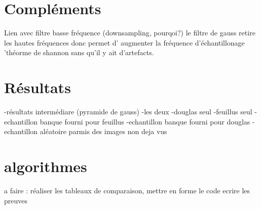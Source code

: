 \documentclass{article}
\begin{document}
\nocite{NatesanResNet} %



\appendix

	\section{Compléments}
		Lien avec filtre basse fréquence (downsampling, pourqoi?)
		le filtre de gauss retire les hautes fréquences donc permet d' augmenter la fréquence d'échantillonage 'théorme de shannon sans qu'il y ait d'artefacts. 
	
	\section{Résultats}	
		-résultats intermédiare (pyramide de gauss)
		-les deux 
		-douglas seul 
		-feuillus seul
		-echantillon banque fourni pour feuillus
		-echantillon banque fourni pour douglas 
		-echantillon aléatoire parmis des images non deja vus
	
	\section{algorithmes}


a faire : réaliser les tableaux de comparaison, mettre en forme le code 
ecrire les preuves 
\end{document}
